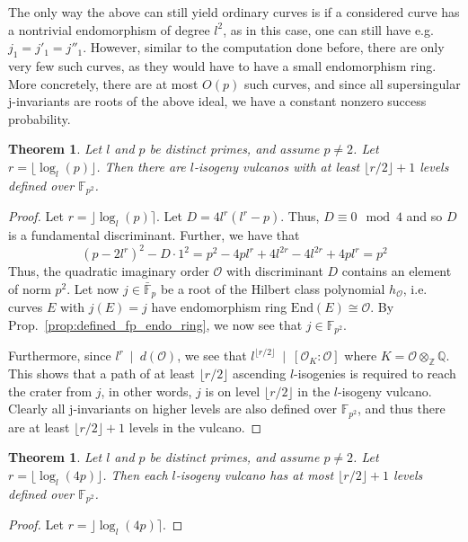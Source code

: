 \documentclass{scrartcl}
\newcommand{\Z}{\mathbb{Z}}
\newcommand{\F}{\mathbb{F}}
\newcommand{\End}{\mathrm{End}}
\newcommand{\divides}{\ \mid \ }
\renewcommand{\O}{\mathcal{O}}
\newtheorem{theorem}[prop]{Theorem}
\theoremstyle{definition}
\begin{document}
The only way the above can still yield ordinary curves is if a considered curve has a nontrivial endomorphism of degree $l^2$, as in this case, one can still have e.g. $j_1 = j'_1 = j''_1$.
However, similar to the computation done before, there are only very few such curves, as they would have to have a small endomorphism ring.
More concretely, there are at most $O(p)$ such curves, and since all supersingular j-invariants are roots of the above ideal, we have a constant nonzero success probability.

\begin{theorem}
    Let $l$ and $p$ be distinct primes, and assume $p \neq 2$.
    Let $r = \lfloor \log_l(p) \rfloor$.
    Then there are $l$-isogeny vulcanos with at least $\lfloor r/2 \rfloor + 1$ levels defined over $\F_{p^2}$.
\end{theorem}
\begin{proof}
    Let $r = \rfloor \log_l(p) \rceil$.
    Let $D = 4l^r(l^r - p)$.
    Thus, $D \equiv 0 \mod 4$ and so $D$ is a fundamental discriminant.
    Further, we have that
    \begin{equation*}
       (p - 2l^r)^2 - D \cdot 1^2 = p^2 - 4pl^r + 4l^{2r} - 4l^{2r} + 4pl^r = p^2
    \end{equation*}
    Thus, the quadratic imaginary order $\O$ with discriminant $D$ contains an element of norm $p^2$.
    Let now $j \in \bar{\F}_p$ be a root of the Hilbert class polynomial $h_\O$, i.e. curves $E$ with $j(E) = j$ have endomorphism ring $\End(E) \cong \O$.
    By Prop.~\ref{prop:defined_fp_endo_ring}, we now see that $j \in \F_{p^2}$.

    Furthermore, since $l^r \divides d(\O)$, we see that $l^{\lfloor r/2 \rfloor} \divides [\O_K : \O]$ where $K = \O \otimes_\Z \mathbb{Q}$.
    This shows that a path of at least $\lfloor r/2 \rfloor$ ascending $l$-isogenies is required to reach the crater from $j$, in other words, $j$ is on level $\lfloor r/2 \rfloor$ in the $l$-isogeny vulcano.
    Clearly all j-invariants on higher levels are also defined over $\F_{p^2}$, and thus there are at least $\lfloor r/2 \rfloor + 1$ levels in the vulcano.
\end{proof}

\begin{theorem}
    Let $l$ and $p$ be distinct primes, and assume $p \neq 2$.
    Let $r = \lfloor \log_l(4p) \rfloor$.
    Then each $l$-isogeny vulcano has at most $\lfloor r/2 \rfloor + 1$ levels defined over $\F_{p^2}$.
\end{theorem}
\begin{proof}
    Let $r = \rfloor \log_l(4p) \rceil$.
\end{proof}
\end{document}
